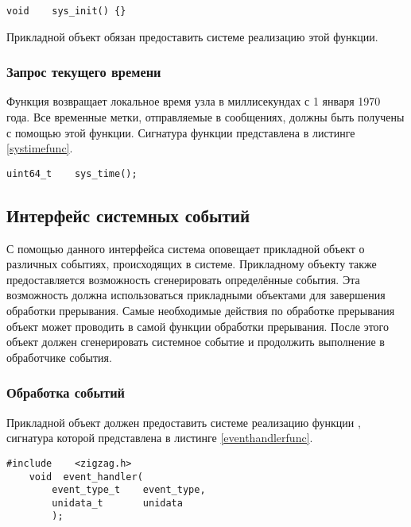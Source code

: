 \begin{lstlisting}[caption=\myfunc{sys\_init()} - инициализация системы, label=sysinitfunc ]
    void    sys_init() {}
\end{lstlisting}

Прикладной объект обязан предоставить системе \zigzag реализацию этой функции.

\subsubsection{Запрос текущего времени}

Функция  возвращает локальное время узла в миллисекундах с 1 января 1970 года.
Все временные метки, отправляемые в сообщениях, должны быть получены с помощью этой функции.
Сигнатура функции представлена в листинге \ref{systimefunc}.

\begin{lstlisting}[caption=\myfunc{sys\_time()} - текущее время, label=systimefunc ]
    uint64_t    sys_time();
\end{lstlisting}

\subsection{Интерфейс системных событий}
\label{SysEventSect}

С помощью данного интерфейса система \zigzag оповещает прикладной объект о различных событиях, происходящих в системе.
Прикладному объекту также предоставляется возможность сгенерировать определённые события. Эта возможность должна использоваться
прикладными объектами для завершения обработки прерывания. Самые необходимые действия по обработке прерывания объект может
проводить в самой функции обработки прерывания. После этого объект должен сгенерировать системное событие и продолжить выполнение
в обработчике события.

\subsubsection{Обработка событий}

Прикладной объект должен предоставить системе \zigzag реализацию функции , сигнатура
которой представлена в листинге \ref{eventhandlerfunc}.

\begin{lstlisting}[caption=Функция \myfunc{event\_handler()} - обработчик событий., label=eventhandlerfunc ]
    #include    <zigzag.h>
    void  event_handler(
        event_type_t    event_type,
        unidata_t       unidata
        );
\end{lstlisting}

